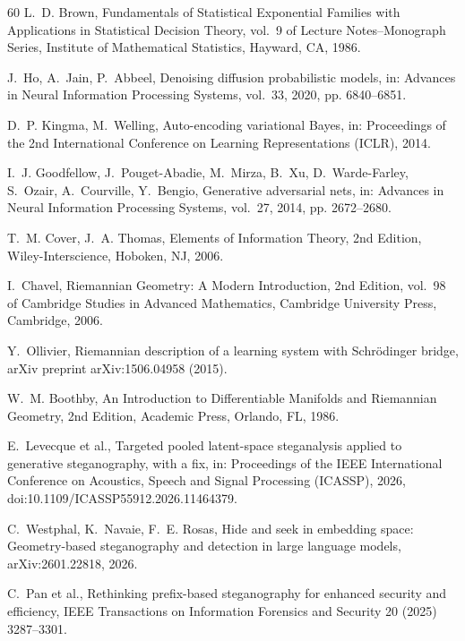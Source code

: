 \documentclass[a4paper,fleqn]{cas-dc}
\begin{document}
\begin{thebibliography}{60}
L.~D. Brown, Fundamentals of Statistical Exponential Families with Applications in Statistical Decision Theory, vol.~9 of Lecture Notes--Monograph Series, Institute of Mathematical Statistics, Hayward, CA, 1986.

J.~Ho, A.~Jain, P.~Abbeel, Denoising diffusion probabilistic models, in: Advances in Neural Information Processing Systems, vol.~33, 2020, pp. 6840--6851.

D.~P. Kingma, M.~Welling, Auto-encoding variational Bayes, in: Proceedings of the 2nd International Conference on Learning Representations (ICLR), 2014.

I.~J. Goodfellow, J.~Pouget-Abadie, M.~Mirza, B.~Xu, D.~Warde-Farley, S.~Ozair, A.~Courville, Y.~Bengio, Generative adversarial nets, in: Advances in Neural Information Processing Systems, vol.~27, 2014, pp. 2672--2680.

T.~M. Cover, J.~A. Thomas, Elements of Information Theory, 2nd Edition, Wiley-Interscience, Hoboken, NJ, 2006.

I.~Chavel, Riemannian Geometry: A Modern Introduction, 2nd Edition, vol.~98 of Cambridge Studies in Advanced Mathematics, Cambridge University Press, Cambridge, 2006.

Y.~Ollivier, Riemannian description of a learning system with Schr{\"o}dinger bridge, arXiv preprint arXiv:1506.04958 (2015).

W.~M. Boothby, An Introduction to Differentiable Manifolds and Riemannian Geometry, 2nd Edition, Academic Press, Orlando, FL, 1986.

E.~Levecque et al., Targeted pooled latent-space steganalysis applied to generative steganography, with a fix, in: Proceedings of the IEEE International Conference on Acoustics, Speech and Signal Processing (ICASSP), 2026, doi:10.1109/ICASSP55912.2026.11464379.

C.~Westphal, K.~Navaie, F.~E. Rosas, Hide and seek in embedding space: Geometry-based steganography and detection in large language models, arXiv:2601.22818, 2026.

C.~Pan et al., Rethinking prefix-based steganography for enhanced security and efficiency, IEEE Transactions on Information Forensics and Security 20 (2025) 3287--3301.


\end{thebibliography}
\end{document}
